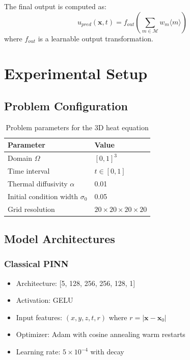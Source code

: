 \documentclass[11pt,a4paper,uplatex,dvipdfmx]{jsarticle}
\begin{document}
The final output is computed as:
\begin{equation}
    u_{pred}(\mathbf{x}, t) = f_{out}\left(\sum_{m \in \mathcal{M}} w_m \langle m \rangle\right)
\end{equation}
where $f_{out}$ is a learnable output transformation.

\section{Experimental Setup}

\subsection{Problem Configuration}

\begin{table}[h]
\centering
\caption{Problem parameters for the 3D heat equation}
\begin{tabular}{ll}
\toprule
Parameter & Value \\
\midrule
Domain $\Omega$ & $[0, 1]^3$ \\
Time interval & $t \in [0, 1]$ \\
Thermal diffusivity $\alpha$ & 0.01 \\
Initial condition width $\sigma_0$ & 0.05 \\
Grid resolution & $20 \times 20 \times 20 \times 20$ \\
\bottomrule
\end{tabular}
\end{table}

\subsection{Model Architectures}

\subsubsection{Classical PINN}
\begin{itemize}
    \item Architecture: [5, 128, 256, 256, 128, 1]
    \item Activation: GELU
    \item Input features: $(x, y, z, t, r)$ where $r = |\mathbf{x} - \mathbf{x}_0|$
    \item Optimizer: Adam with cosine annealing warm restarts
    \item Learning rate: $5 \times 10^{-4}$ with decay
\end{itemize}
\end{document}
